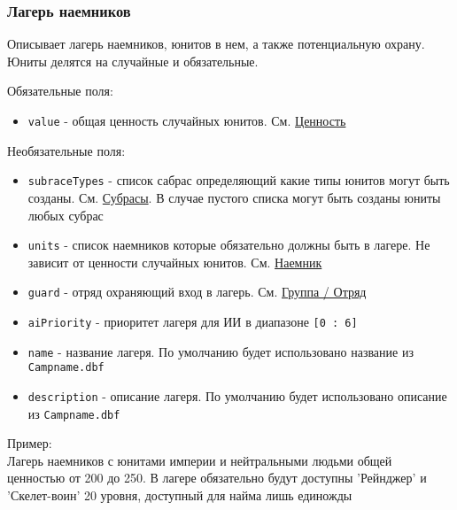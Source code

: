 \subsubsection{Лагерь наемников}
\label{mercenary}
Описывает лагерь наемников, юнитов в нем, а также потенциальную охрану. Юниты делятся на случайные и обязательные.

Обязательные поля:
\begin{itemize}
\item \texttt{value} - общая ценность случайных юнитов. См. \hyperref[value]{Ценность}
\end{itemize}

Необязательные поля:
\begin{itemize}
\item \texttt{subraceTypes} - список сабрас определяющий какие типы юнитов могут быть созданы. См. \hyperref[subraceTypes]{Субрасы}. В случае пустого списка могут быть созданы юниты любых субрас
\item \texttt{units} - список наемников которые обязательно должны быть в лагере. Не зависит от ценности случайных юнитов. См. \hyperref[mercenaryUnit]{Наемник}
\item \texttt{guard} - отряд охраняющий вход в лагерь. См. \hyperref[group]{Группа / Отряд}
\item \texttt{aiPriority} - приоритет лагеря для ИИ в диапазоне \texttt{[0 : 6]}
\item \texttt{name} - название лагеря. По умолчанию будет использовано название из \texttt{Campname.dbf}
\item \texttt{description} - описание лагеря. По умолчанию будет использовано описание из \texttt{Campname.dbf}
\end{itemize}

Пример:\\
Лагерь наемников с юнитами империи и нейтральными людьми общей ценностью от 200 до 250.
В лагере обязательно будут доступны 'Рейнджер' и 'Скелет-воин' 20 уровня, доступный для найма лишь единожды

\begin{figure}[H]

\end{figure}